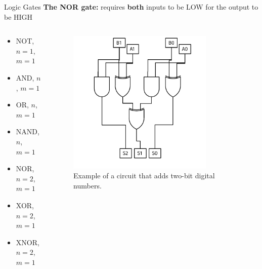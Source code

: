 \documentclass{beamer}
\begin{document}
\begin{frame}{Logic Gates}
\textbf{The NOR gate:} requires \textbf{both} inputs to be LOW for the output to be HIGH \\ \vspace{0.5cm}
\begin{columns}[T]
\begin{column}{0.5\textwidth}
\begin{itemize}
\item \alert{NOT, $n=1$, $m=1$}
\item \alert{AND, $n$, $m=1$}
\item \alert{OR, $n$, $m=1$}
\item \alert{NAND, $n$, $m=1$}
\item \alert{NOR, $n=2$, $m=1$}
\item \alert{XOR, $n=2$, $m=1$}
\item \alert{XNOR, $n=2$, $m=1$}
\end{itemize}
\end{column}
\begin{column}{0.5\textwidth}
\begin{figure}
\centering
\includegraphics[width=0.8\textwidth]{figures/TwoBitAdder.pdf}
\caption{\label{fig:add} Example of a circuit that adds two-bit digital numbers.}
\end{figure}
\end{column}
\end{columns}
\end{frame}
\end{document}
